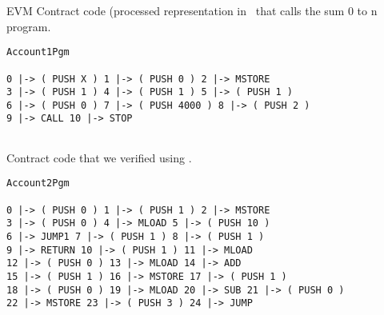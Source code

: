 \pagebreak
EVM Contract code (processed representation in \K{} \ that calls the sum 0 to n program.

\begin{verbatim}
Account1Pgm

0 |-> ( PUSH X ) 1 |-> ( PUSH 0 ) 2 |-> MSTORE 
3 |-> ( PUSH 1 ) 4 |-> ( PUSH 1 ) 5 |-> ( PUSH 1 ) 
6 |-> ( PUSH 0 ) 7 |-> ( PUSH 4000 ) 8 |-> ( PUSH 2 ) 
9 |-> CALL 10 |-> STOP 
            
\end{verbatim}
Contract code that we verified using \K{}.


\begin{verbatim}
Account2Pgm

0 |-> ( PUSH 0 ) 1 |-> ( PUSH 1 ) 2 |-> MSTORE 
3 |-> ( PUSH 0 ) 4 |-> MLOAD 5 |-> ( PUSH 10 ) 
6 |-> JUMP1 7 |-> ( PUSH 1 ) 8 |-> ( PUSH 1 ) 
9 |-> RETURN 10 |-> ( PUSH 1 ) 11 |-> MLOAD 
12 |-> ( PUSH 0 ) 13 |-> MLOAD 14 |-> ADD 
15 |-> ( PUSH 1 ) 16 |-> MSTORE 17 |-> ( PUSH 1 ) 
18 |-> ( PUSH 0 ) 19 |-> MLOAD 20 |-> SUB 21 |-> ( PUSH 0 ) 
22 |-> MSTORE 23 |-> ( PUSH 3 ) 24 |-> JUMP
\end{verbatim}
